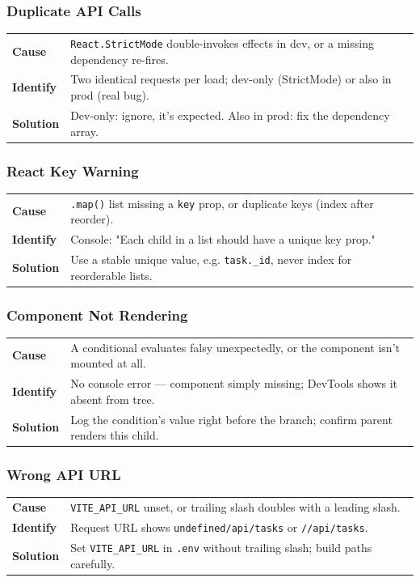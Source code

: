\subsubsection*{Duplicate API Calls}
\noindent\begin{tabularx}{\textwidth}{@{}>{\bfseries}p{2.3cm}X@{}}
\toprule
Cause & \texttt{React.StrictMode} double-invokes effects in dev, or a missing dependency re-fires. \\
Identify & Two identical requests per load; dev-only (StrictMode) or also in prod (real bug). \\
Solution & Dev-only: ignore, it's expected. Also in prod: fix the dependency array. \\
\bottomrule
\end{tabularx}

\subsubsection*{React Key Warning}
\noindent\begin{tabularx}{\textwidth}{@{}>{\bfseries}p{2.3cm}X@{}}
\toprule
Cause & \texttt{.map()} list missing a \texttt{key} prop, or duplicate keys (index after reorder). \\
Identify & Console: "Each child in a list should have a unique key prop." \\
Solution & Use a stable unique value, e.g. \texttt{task.\_id}, never index for reorderable lists. \\
\bottomrule
\end{tabularx}

\subsubsection*{Component Not Rendering}
\noindent\begin{tabularx}{\textwidth}{@{}>{\bfseries}p{2.3cm}X@{}}
\toprule
Cause & A conditional evaluates falsy unexpectedly, or the component isn't mounted at all. \\
Identify & No console error --- component simply missing; DevTools shows it absent from tree. \\
Solution & Log the condition's value right before the branch; confirm parent renders this child. \\
\bottomrule
\end{tabularx}

\subsubsection*{Wrong API URL}
\noindent\begin{tabularx}{\textwidth}{@{}>{\bfseries}p{2.3cm}X@{}}
\toprule
Cause & \texttt{VITE\_API\_URL} unset, or trailing slash doubles with a leading slash. \\
Identify & Request URL shows \texttt{undefined/api/tasks} or \texttt{//api/tasks}. \\
Solution & Set \texttt{VITE\_API\_URL} in \texttt{.env} without trailing slash; build paths carefully. \\
\bottomrule
\end{tabularx}


